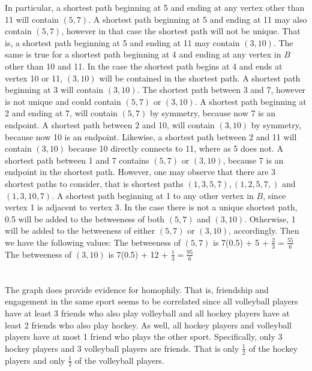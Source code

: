 \documentclass[12pt]{article}
\begin{document}
In particular, a shortest path beginning at 5 and ending at any vertex other than 11 will contain $(5,7)$. A shortest path beginning at 5 and ending at 11 may also contain $(5,7)$, however in that case the shortest path will not be unique. That is, a shortest path beginning at 5 and ending at 11 may contain $(3,10)$. The same is true for a shortest path beginning at 4 and ending at any vertex in $B$ other than 10 and 11. In the case the shortest path begins at 4 and ends at vertex 10 or 11, $(3,10)$ will be contained in the shortest path. A shortest path beginning at 3 will contain $(3,10)$. The shortest path between 3 and 7, however is not unique and could contain $(5,7)$ or $(3,10)$. A shortest path beginning at 2 and ending at 7, will contain $(5,7)$ by symmetry, because now 7 is an endpoint. A shortest path between 2 and 10, will contain $(3,10)$ by symmetry, because now 10 is an endpoint. Likewise, a shortest path between 2 and 11 will contain $(3,10)$ because 10 directly connects to 11, where as 5 does not. A shortest path between 1 and 7 contains $(5,7)$ or $(3,10)$, because 7 is an endpoint in the shortest path. However, one may observe that there are 3 shortest paths to consider, that is shortest paths $(1,3,5,7), (1,2,5,7,)$ and $(1,3,10,7)$. A shortest path beginning at 1 to any other vertex in $B$, since vertex 1 is adjacent to vertex 3. 
\newline 
\newline 
In the case there is not a unique shortest path, 0.5 will be added to the betweeness of both $(5,7)$ and $(3,10)$. Otherwise, 1 will be added to the betweeness of either $(5,7)$ or $(3,10)$, accordingly. Then we have the following values:
\newline 
\newline 
The betweeness of $(5,7)$ is 7(0.5) + 5 + $\frac{2}{3} = \frac{55}{6}$ \\ The betweeness of $(3,10)$ is 7(0.5) + 12 + $\frac{1}{3} = \frac{95}{6}$

\newpage 
\section{}
\subsection{}
The graph does provide evidence for homophily. That is, friendship and engagement in the same sport seems to be correlated since all volleyball players have at least 3 friends who also play volleyball and all hockey players have at least 2 friends who also play hockey. As well, all hockey players and volleyball players have at most 1 friend who plays the other sport. Specifically, only 3 hockey players and 3 volleyball players are friends. That is only $\frac{1}{2}$ of the hockey players and only $\frac{1}{2}$ of the volleyball players. 
\end{document}
